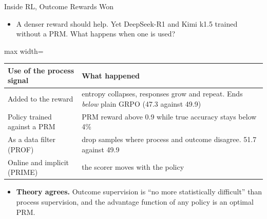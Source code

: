 \begin{frame}{Inside RL, Outcome Rewards Won}
    \begin{itemize}\itemsep0.3em
        \item A denser reward should help. Yet DeepSeek-R1 and Kimi k1.5 trained without a PRM. What happens when one is used?
    \end{itemize}
    \begin{center}
    \small
    \renewcommand{\arraystretch}{1.12}
    \begin{adjustbox}{max width=\linewidth}\begin{tabular}{>{\raggedright\arraybackslash}p{4.4cm}>{\raggedright\arraybackslash}p{9.4cm}}
        \toprule
        \textbf{Use of the process signal} & \textbf{What happened} \\
        \midrule
        Added to the reward & entropy collapses, responses grow and repeat. Ends \emph{below} plain GRPO (47.3 against 49.9) \\
        Policy trained against a PRM & PRM reward above 0.9 while true accuracy stays below 4\% \\
        \rowcolor{KAUSTcyan!12} As a data filter (PROF) & drop samples where process and outcome disagree. 51.7 against 49.9 \\
        \rowcolor{KAUSTcyan!12} Online and implicit (PRIME) & the scorer moves with the policy \\
        \bottomrule
    \end{tabular}\end{adjustbox}
    \end{center}
    \begin{itemize}\itemsep0.3em
        \item \textbf{Theory agrees.} Outcome supervision is ``no more statistically difficult'' than process supervision, and the advantage function of any policy is an optimal PRM.
    \end{itemize}
    \vspace{-0.2em}
\end{frame}

